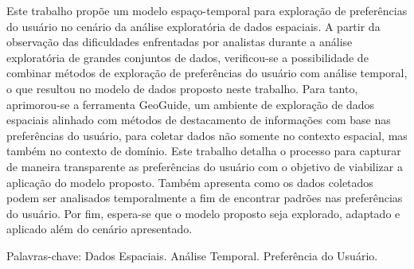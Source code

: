 






\setlength{\absparsep}{18pt} %
\begin{resumo}
	Este trabalho propõe um modelo espaço-temporal para exploração de preferências do usuário no cenário da análise exploratória de dados espaciais. A partir da observação das dificuldades enfrentadas por analistas durante a análise exploratória de grandes conjuntos de dados, verificou-se a possibilidade de combinar métodos de exploração de preferências do usuário com análise temporal, o que resultou no modelo de dados proposto neste trabalho. Para tanto, aprimorou-se a ferramenta GeoGuide, um ambiente de exploração de dados espaciais alinhado com métodos de destacamento de informações com base nas preferências do usuário, para coletar dados não somente no contexto espacial, mas também no contexto de domínio. Este trabalho detalha o processo para capturar de maneira transparente as preferências do usuário com o objetivo de viabilizar a aplicação do modelo proposto. Também apresenta como os dados coletados podem ser analisados temporalmente a fim de encontrar padrões nas preferências do usuário. Por fim, espera-se que o modelo proposto seja explorado, adaptado e aplicado além do cenário apresentado.


  \noindent
  {Palavras-chave}: Dados Espaciais. Análise Temporal. Preferência do Usuário.
\end{resumo}